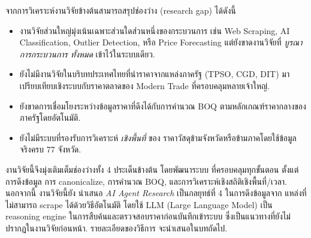 จากการวิเคราะห์งานวิจัยข้างต้นสามารถสรุปช่องว่าง (research gap) ได้ดังนี้

\begin{itemize}[leftmargin=2em,itemsep=0.2em]
  \item งานวิจัยส่วนใหญ่มุ่งเน้นเฉพาะส่วนใดส่วนหนึ่งของกระบวนการ
        เช่น Web Scraping, AI Classification, Outlier Detection, หรือ
        Price Forecasting แต่ยังขาดงานวิจัยที่ \emph{บูรณาการกระบวนการ
        ทั้งหมด} เข้าไว้ในระบบเดียว.
  \item ยังไม่มีงานวิจัยในบริบทประเทศไทยที่นำราคาจากแหล่งภาครัฐ
        (TPSO, CGD, DIT) มาเปรียบเทียบเชิงระบบกับราคาตลาดของ Modern
        Trade ที่ครอบคลุมหลายเจ้าใหญ่.
  \item ยังขาดการเชื่อมโยงระหว่างข้อมูลราคาที่ดึงได้กับการคำนวณ BOQ
        ตามหลักเกณฑ์ราคากลางของภาครัฐโดยอัตโนมัติ.
  \item ยังไม่มีระบบที่รองรับการวิเคราะห์ \emph{เชิงพื้นที่} ของ
        ราคาวัสดุข้ามจังหวัดหรือข้ามภาคโดยใช้ข้อมูลจริงครบ 77 จังหวัด.
\end{itemize}

งานวิจัยนี้จึงมุ่งเติมเต็มช่องว่างทั้ง 4 ประเด็นข้างต้น โดยพัฒนาระบบ
ที่ครอบคลุมทุกขั้นตอน ตั้งแต่การดึงข้อมูล การ canonicalize, การคำนวณ
BOQ, และการวิเคราะห์เชิงสถิติเชิงพื้นที่/เวลา. นอกจากนี้ งานวิจัยนี้ยัง
นำเสนอ \emph{AI Agent Research} เป็นกลยุทธ์ที่ 4 ในการดึงข้อมูลจาก
แหล่งที่ไม่สามารถ scrape ได้ด้วยวิธีอัตโนมัติ โดยใช้ LLM (Large Language
Model) เป็น reasoning engine ในการสืบค้นและตรวจสอบราคาก่อนบันทึกเข้าระบบ
ซึ่งเป็นแนวทางที่ยังไม่ปรากฏในงานวิจัยก่อนหน้า. รายละเอียดของวิธีการ
จะนำเสนอในบทถัดไป.
